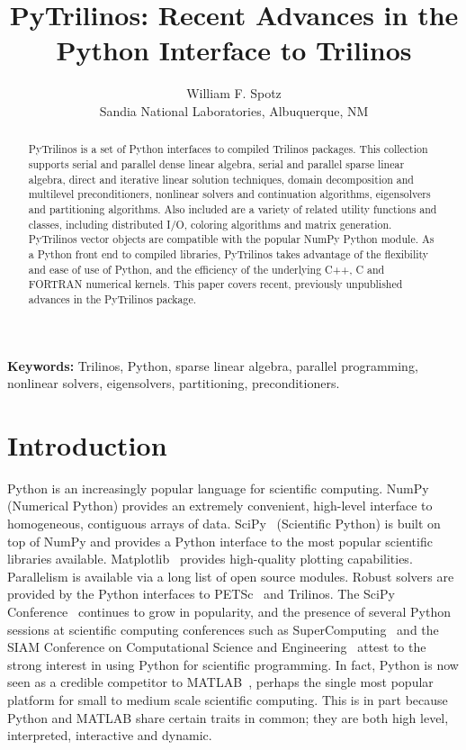 \documentclass[11pt]{article}
\title{PyTrilinos: Recent Advances in the \\ Python Interface to Trilinos}
\author{William F. Spotz \\ Sandia National Laboratories, Albuquerque, NM}
\newif\ifpdf
\begin{document}
\ifpdf
\DeclareGraphicsExtensions{.pdf, .jpg, .tif}
\else
{}
\fi

\maketitle

\begin{abstract}
PyTrilinos is a set of Python interfaces to compiled Trilinos packages.  This collection supports serial and parallel dense linear algebra, serial and parallel sparse linear algebra, direct and iterative linear solution techniques, domain decomposition and multilevel preconditioners, nonlinear solvers and continuation algorithms, eigensolvers and partitioning algorithms.  Also included are a variety of related utility functions and classes, including distributed I/O, coloring algorithms and matrix generation.  PyTrilinos vector objects are compatible with the popular NumPy Python module.  As a Python front end to compiled libraries, PyTrilinos takes advantage of the flexibility and ease of use of Python, and the efficiency of the underlying C++, C and FORTRAN numerical kernels.  This paper covers recent, previously unpublished advances in the PyTrilinos package.
\end{abstract}

{\bf Keywords:} Trilinos, Python, sparse linear algebra, parallel programming, nonlinear solvers, eigensolvers, partitioning, preconditioners.

\section{Introduction}
\label{sec:introduction}

Python is an increasingly popular language for scientific computing.  NumPy~\cite{NumPyGuide} (Numerical Python) provides an extremely convenient, high-level interface to homogeneous, contiguous arrays of data.  SciPy~\cite{SciPyRefGuide} (Scientific Python) is built on top of NumPy and provides a Python interface to the most popular scientific libraries available.  Matplotlib~\cite{Matplotlib} provides high-quality plotting capabilities.  Parallelism is available via a long list of open source modules.  Robust solvers are provided by the Python interfaces to PETSc~\cite{PETScUserRef} and Trilinos.  The SciPy Conference~\cite{SciPyConference} continues to grow in popularity, and the presence of several Python sessions at scientific computing conferences such as SuperComputing~\cite{SuperComputing} and the SIAM Conference on Computational Science and Engineering~\cite{SIAM_CSE} attest to the strong interest in using Python for scientific programming.  In fact, Python is now seen as a credible competitor to MATLAB~\cite{MATLAB}, perhaps the single most popular platform for small to medium scale scientific computing.  This is in part because Python and MATLAB share certain traits in common; they are both high level, interpreted, interactive and dynamic.
\end{document}
